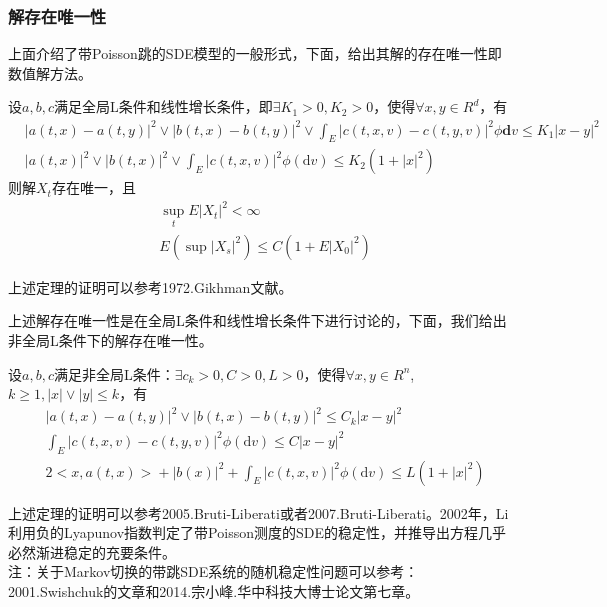         \subsubsection{解存在唯一性}
            \par
            上面介绍了带Poisson跳的SDE模型的一般形式，下面，给出其解的存在唯一性即数值解方法。
            \begin{theorem}[解存在唯一性]
                设$a,b,c$满足全局L条件和线性增长条件，即$\exists K_1>0,K_2>0$，使得$\forall x,y \in R^d$，有
                \begin{align*}
                &|a(t,x) - a(t,y) |^2 \vee |b(t,x) - b(t,y) |^2 \vee \int_E |c(t,x,v) - c(t,y,v) |^2\phi \mathbf{d}v \leqslant K_1|x-y|^2\\
                &|a(t,x)|^2 \vee|b(t,x)|^2 \vee\int_E|c(t,x,v)|^2\phi(\mathrm{d}v) \leqslant K_2(1+|x|^2)
                \end{align*}
                则解$X_t$存在唯一，且
                \begin{align*}
                    &\sup\limits_t E|X_t|^2 <\infty\\
                    &E \left( \sup|X_s|^2 \right) \leqslant C(1+E|X_0|^2)
                \end{align*}
            \end{theorem}
            \par
            上述定理的证明可以参考1972.Gikhman文献\cite{1972.Gikhman}。
            \par
            上述解存在唯一性是在全局L条件和线性增长条件下进行讨论的，下面，我们给出非全局L条件下的解存在唯一性。
            \begin{theorem}[非全局L条件下解存在唯一性]
                设$a,b,c$满足非全局L条件：$\exists c_k>0,C>0,L>0$，使得$\forall x,y\in R^n$,$k \geqslant 1,|x|\vee|y| \leqslant k$，有
                \begin{align*}
                    &|a(t,x) - a(t,y) |^2 \vee |b(t,x) - b(t,y) |^2 \leqslant C_k|x-y|^2 \\
                    &\int_E|c(t,x,v) - c(t,y,v)|^2\phi(\mathrm{d}v) \leqslant C|x -y|^2\\
                    &2\bigl<x,a(t,x)\bigr>+|b(x)|^2 + \int_E|c(t,x,v)|^2\phi(\mathrm{d}v) \leqslant L(1+|x|^2)
                \end{align*}
            \end{theorem}
            上述定理的证明可以参考2005.Bruti-Liberati\cite{2005.Bruti-Liberati}或者2007.Bruti-Liberati\cite{2007.Bruti-Liberati}。2002年，Li利用负的Lyapunov指数判定了带Poisson测度的SDE的稳定性，并推导出方程几乎必然渐进稳定的充要条件。\\
            注：关于Markov切换的带跳SDE系统的随机稳定性问题可以参考：2001.Swishchuk的文章\cite{2001.Swishchuk}和2014.宗小峰.华中科技大博士论文\cite{zong.2014}第七章。
